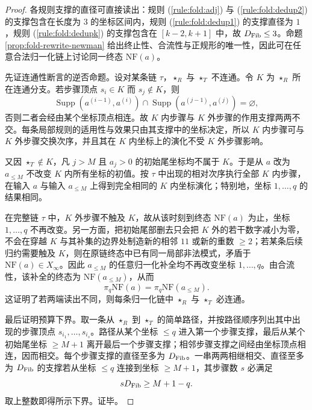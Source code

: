 \begin{proof}
各规则支撑的直径可直接读出：规则 \textup{(\ref{rule:fold:adj})} 与
\textup{(\ref{rule:fold:dedup2})} 的支撑包含在长度为 \(3\) 的坐标区间内，规则
\textup{(\ref{rule:fold:dedup1})} 的支撑直径为 \(1\)，规则
\textup{(\ref{rule:fold:dedupk})} 的支撑包含在
\([k-2,k+1]\) 中，故 \(D_{\rm Fib}\le3\)。命题
\ref{prop:fold-rewrite-newman} 给出终止性、合流性与正规形的唯一性，因此可在任意合法归一化链上讨论同一终态
\(\mathrm{NF}(a)\)。

先证连通性断言的逆否命题。设对某条链 \(\tau\)，\(\star_R\) 与 \(\star_T\) 不连通。令
\(K\) 为 \(\star_R\) 所在连通分支。若步骤顶点 \(s_i\in K\) 而 \(s_j\notin K\)，则
\[
\operatorname{Supp}(a^{(i-1)},a^{(i)})\cap
\operatorname{Supp}(a^{(j-1)},a^{(j)})=\varnothing,
\]
否则二者会经由某个坐标顶点相连。故 \(K\) 内步骤与 \(K\) 外步骤的作用支撑两两不交。每条局部规则的适用性与效果只由其支撑中的坐标决定，所以 \(K\) 内步骤可与 \(K\) 外步骤交换次序，并且其在 \(K\) 内坐标上的演化不受 \(K\) 外步骤影响。

又因 \(\star_T\notin K\)，凡 \(j>M\) 且 \(a_j>0\) 的初始尾坐标均不属于 \(K\)。于是从 \(a\) 改为
\(a_{\le M}\) 不改变 \(K\) 内所有坐标的初值。按 \(\tau\) 中出现的相对次序执行全部 \(K\) 内步骤，在输入 \(a\) 与输入
\(a_{\le M}\) 上得到完全相同的 \(K\) 内坐标演化；特别地，坐标 \(1,\ldots,q\) 的结果相同。

在完整链 \(\tau\) 中，\(K\) 外步骤不触及 \(K\)，故从该时刻到终态
\(\mathrm{NF}(a)\) 为止，坐标 \(1,\ldots,q\) 不再改变。另一方面，把初始尾部删去只会把 \(K\) 外的若干数字减小为零，不会在穿越
\(K\) 与其补集的边界处制造新的相邻 \(11\) 或新的重数 \(\ge2\)；若某条后续归约需要触及 \(K\)，则在原链终态中已有同一局部非法模式，矛盾于
\(\mathrm{NF}(a)\in X_\infty\)。因此 \(a_{\le M}\) 的任意归一化补全均不再改变坐标
\(1,\ldots,q\)。由合流性，该补全的终态为 \(\mathrm{NF}(a_{\le M})\)，从而
\[
\pi_q\mathrm{NF}(a)=\pi_q\mathrm{NF}(a_{\le M}).
\]
这证明了若两端读出不同，则每条归一化链中 \(\star_R\) 与 \(\star_T\) 必连通。

最后证明预算下界。取一条从 \(\star_R\) 到 \(\star_T\) 的简单路径，并按路径顺序列出其中出现的步骤顶点
\(s_{i_1},\ldots,s_{i_s}\)。路径从某个坐标 \(\le q\) 进入第一个步骤支撑，最后从某个初始尾坐标
\(\ge M+1\) 离开最后一个步骤支撑；相邻步骤支撑之间经由坐标顶点相连，因而相交。每个步骤支撑的直径至多为
\(D_{\rm Fib}\)。一串两两相继相交、直径至多为 \(D_{\rm Fib}\) 的支撑若从坐标
\(\le q\) 连接到坐标 \(\ge M+1\)，其步骤数 \(s\) 必满足
\[
sD_{\rm Fib}\ge M+1-q.
\]
取上整数即得所示下界。证毕。
\end{proof}


